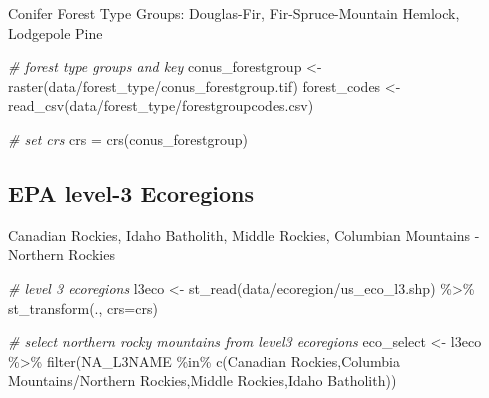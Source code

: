 \documentclass[
]{book}
\newenvironment{Shaded}{\begin{snugshade}}{\end{snugshade}}
\newcommand{\AttributeTok}[1]{\textcolor[rgb]{0.77,0.63,0.00}{#1}}
\newcommand{\CommentTok}[1]{\textcolor[rgb]{0.56,0.35,0.01}{\textit{#1}}}
\newcommand{\FunctionTok}[1]{\textcolor[rgb]{0.00,0.00,0.00}{#1}}
\newcommand{\NormalTok}[1]{#1}
\newcommand{\OtherTok}[1]{\textcolor[rgb]{0.56,0.35,0.01}{#1}}
\newcommand{\SpecialCharTok}[1]{\textcolor[rgb]{0.00,0.00,0.00}{#1}}
\newcommand{\StringTok}[1]{\textcolor[rgb]{0.31,0.60,0.02}{#1}}
\begin{document}
Conifer Forest Type Groups: Douglas-Fir, Fir-Spruce-Mountain Hemlock, Lodgepole Pine

\begin{Shaded}
\begin{Highlighting}[]
\CommentTok{\# forest type groups and key}
\NormalTok{conus\_forestgroup }\OtherTok{\textless{}{-}} \FunctionTok{raster}\NormalTok{(}\StringTok{\textquotesingle{}data/forest\_type/conus\_forestgroup.tif\textquotesingle{}}\NormalTok{)}
\NormalTok{forest\_codes }\OtherTok{\textless{}{-}} \FunctionTok{read\_csv}\NormalTok{(}\StringTok{\textquotesingle{}data/forest\_type/forestgroupcodes.csv\textquotesingle{}}\NormalTok{)}

\CommentTok{\# set crs}
\NormalTok{crs }\OtherTok{=} \FunctionTok{crs}\NormalTok{(conus\_forestgroup)}
\end{Highlighting}
\end{Shaded}

\hypertarget{epa-level-3-ecoregions}{%
\subsection{EPA level-3 Ecoregions}\label{epa-level-3-ecoregions}}

Canadian Rockies, Idaho Batholith, Middle Rockies, Columbian Mountains - Northern Rockies

\begin{Shaded}
\begin{Highlighting}[]
\CommentTok{\# level 3 ecoregions}
\NormalTok{l3eco }\OtherTok{\textless{}{-}} \FunctionTok{st\_read}\NormalTok{(}\StringTok{\textquotesingle{}data/ecoregion/us\_eco\_l3.shp\textquotesingle{}}\NormalTok{) }\SpecialCharTok{\%\textgreater{}\%} 
  \FunctionTok{st\_transform}\NormalTok{(., }\AttributeTok{crs=}\NormalTok{crs)}

\CommentTok{\# select northern rocky mountains from level3 ecoregions}
\NormalTok{eco\_select }\OtherTok{\textless{}{-}}\NormalTok{ l3eco }\SpecialCharTok{\%\textgreater{}\%} 
  \FunctionTok{filter}\NormalTok{(NA\_L3NAME }\SpecialCharTok{\%in\%} \FunctionTok{c}\NormalTok{(}\StringTok{\textquotesingle{}Canadian Rockies\textquotesingle{}}\NormalTok{,}\StringTok{\textquotesingle{}Columbia Mountains/Northern Rockies\textquotesingle{}}\NormalTok{,}\StringTok{\textquotesingle{}Middle Rockies\textquotesingle{}}\NormalTok{,}\StringTok{\textquotesingle{}Idaho Batholith\textquotesingle{}}\NormalTok{))}
\end{Highlighting}
\end{Shaded}
\end{document}
